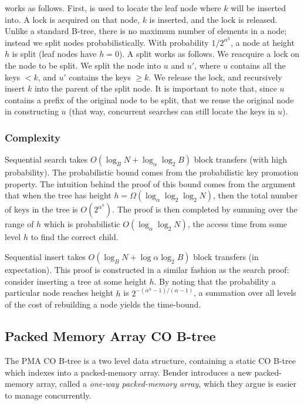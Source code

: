 \documentclass{style}
\begin{document}
\Insert{} works as follows. First, \Search{} is used to locate the leaf node
where $k$ will be inserted into. A lock is acquired on that node, $k$ is
inserted, and the lock is released. Unlike a standard B-tree, there is no
maximum number of elements in a node; instead we split nodes probabilistically.
With probability ${1}/{2^{\alpha^h}}$, a node at height $h$ is split (leaf
nodes have $h = 0$). A split works as follows.  We reacquire a lock on the node
to be split. We split the node into $u$ and $u'$, where $u$ contains all the
keys $< k$, and $u'$ contains the keys $\geq k$. We release the lock, and
recursively insert $k$ into the parent of the split node. It is important
to note that, since $u$ contains a prefix of the original node to be split,
that we reuse the original node in constructing $u$ (that way, concurrent
searches can still locate the keys in $u$).


\subsubsection{Complexity}
Sequential search takes $O(\log_B{N} + \log_{\alpha}{\log_2{B}})$ block
transfers (with high probability). The probabilistic bound comes from the
probabilistic key promotion property. The intuition behind the proof of this
bound comes from the argument that when the tree has height $h =
\Omega(\log_{\alpha}{\log_2{\log_2{N}}})$, then the total number of keys in the
tree is $O(2^{\alpha^h})$. The proof is then completed by summing over the
range of $h$ which is probabilistic $O(\log_{\alpha}{\log_2{N}})$, the access
time from some level $h$ to find the correct child.

Sequential insert takes $O(\log_B{N} + \log{\alpha}{\log_2{B}})$ block
transfers (in expectation). This proof is constructed in a similar 
fashion as the search proof: consider inserting a tree at some height $h$.
By noting that the probability a particular node reaches height $h$
is $2^{-(\alpha^h-1)/(\alpha-1)}$, a summation over all levels
of the cost of rebuilding a node yields the time-bound.

\subsection{Packed Memory Array CO B-tree}
\label{sec:pma}
The PMA CO B-tree is a two level data structure, containing a static
CO B-tree which indexes into a packed-memory array. Bender introduces
a new packed-memory array, called a \textit{one-way packed-memory array},
which they argue is easier to manage concurrently.
\end{document}
